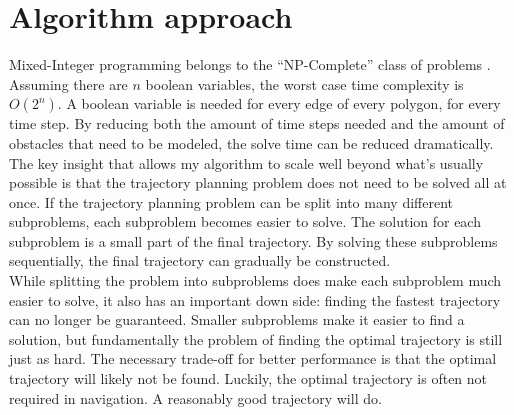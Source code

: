 \section{Algorithm approach}
Mixed-Integer programming belongs to the ``NP-Complete'' class of problems \cite{DBLP:conf/coco/Karp72}. Assuming there are $n$ boolean variables, the worst case time complexity is $O(2^n)$. A boolean variable is needed for every edge of every polygon, for every time step. By reducing both the amount of time steps needed and the amount of obstacles that need to be modeled, the solve time can be reduced dramatically. \\
The key insight that allows my algorithm to scale well beyond what's usually possible is that the trajectory planning problem does not need to be solved all at once. If the trajectory planning problem can be split into many different subproblems, each subproblem becomes easier to solve. The solution for each subproblem is a small part of the final trajectory. By solving these subproblems sequentially, the final trajectory can gradually be constructed. \\
While splitting the problem into subproblems does make each subproblem much easier to solve, it also has an important down side: finding the fastest trajectory can no longer be guaranteed. Smaller subproblems make it easier to find a solution, but fundamentally the problem of finding the optimal trajectory is still just as hard. The necessary trade-off for better performance is that the optimal trajectory will likely not be found. Luckily, the optimal trajectory is often not required in navigation. A reasonably good trajectory will do.

